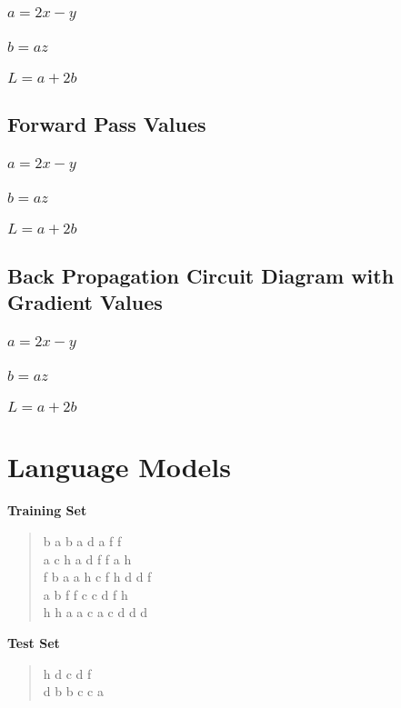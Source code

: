 \documentclass{article}
\begin{document}
\subsubsection{\(a = 2x - y\)}
\subsubsection{\(b = az\)}
\subsubsection{\(L = a + 2b\)}
\subsection{Forward Pass Values}
\subsubsection{\(a = 2x - y\)}
\subsubsection{\(b = az\)}
\subsubsection{\(L = a + 2b\)}
\subsection{Back Propagation Circuit Diagram with Gradient Values}
\subsubsection{\(a = 2x - y\)}
\subsubsection{\(b = az\)}
\subsubsection{\(L = a + 2b\)}
\section{Language Models} 
\textbf{Training Set}
\begin{quote}
	b a b a d a f f 	\\
	a c h a d f f a h 	\\ 
	f b a a h c f h d d f 	\\
	a b f f c c d f h 	\\
	h h a a c a c d d d 	\\
\end{quote}
\textbf{Test Set}
\begin{quote}
	h d c d f \\
	d b b c c a \\
\end{quote}
\end{document}
